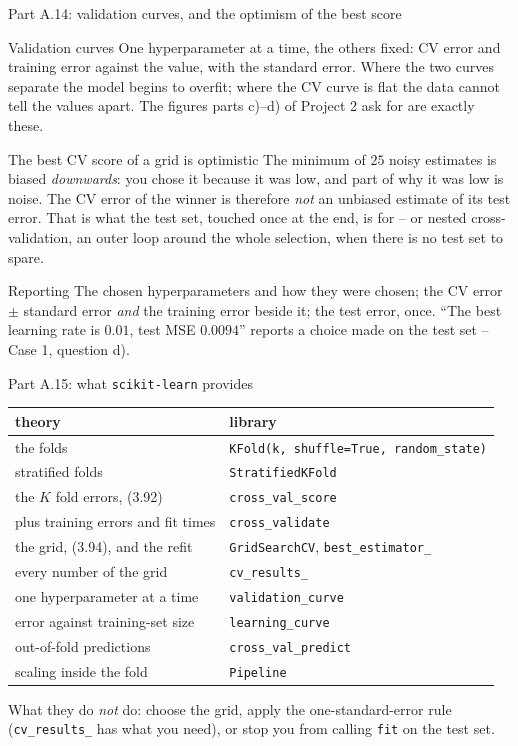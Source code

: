 \documentclass[10pt,aspectratio=169]{beamer}
\begin{document}
\begin{frame}{Part A.14: validation curves, and the optimism of the best score}
\small
\begin{block}{Validation curves}
One hyperparameter at a time, the others fixed: CV error and training
error against the value, with the standard error.  Where the two curves
separate the model begins to overfit; where the CV curve is flat the data
cannot tell the values apart.  The figures parts c)--d) of Project 2 ask
for are exactly these.
\end{block}
\begin{block}{The best CV score of a grid is optimistic}
The minimum of $25$ noisy estimates is biased \emph{downwards}: you chose
it because it was low, and part of why it was low is noise.  The CV error
of the winner is therefore \emph{not} an unbiased estimate of its test
error.  That is what the test set, touched once at the end, is for -- or
nested cross-validation, an outer loop around the whole selection, when
there is no test set to spare.
\end{block}
\begin{block}{Reporting}
The chosen hyperparameters and how they were chosen; the CV error $\pm$
standard error \emph{and} the training error beside it; the test error,
once.  ``The best learning rate is $0.01$, test MSE $0.0094$'' reports a
choice made on the test set -- Case 1, question d).
\end{block}
\end{frame}

\begin{frame}{Part A.15: what \texttt{scikit-learn} provides}
\small
\begin{center}
\begin{tabular}{@{}ll@{}}
\toprule
theory & library\\
\midrule
the folds & \texttt{KFold(k, shuffle=True, random\_state)}\\
stratified folds & \texttt{StratifiedKFold}\\
the $K$ fold errors, (3.92) & \texttt{cross\_val\_score}\\
plus training errors and fit times & \texttt{cross\_validate}\\
the grid, (3.94), and the refit & \texttt{GridSearchCV}, \texttt{best\_estimator\_}\\
every number of the grid & \texttt{cv\_results\_}\\
one hyperparameter at a time & \texttt{validation\_curve}\\
error against training-set size & \texttt{learning\_curve}\\
out-of-fold predictions & \texttt{cross\_val\_predict}\\
scaling inside the fold & \texttt{Pipeline}\\
\bottomrule
\end{tabular}
\end{center}
\medskip
What they do \emph{not} do: choose the grid, apply the one-standard-error
rule (\texttt{cv\_results\_} has what you need), or stop you from calling
\texttt{fit} on the test set.
\end{frame}
\end{document}
